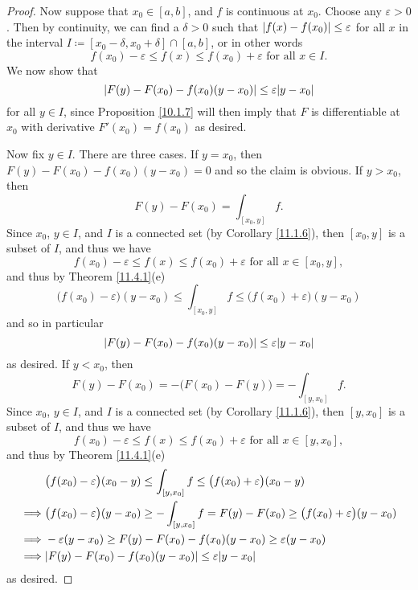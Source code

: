 \begin{proof}
    Now suppose that \(x_0 \in [a, b]\), and \(f\) is continuous at \(x_0\).
    Choose any \(\varepsilon > 0\).
    Then by continuity, we can find a \(\delta > 0\) such that \(\abs*{f(x) - f(x_0)} \leq \varepsilon\) for all \(x\) in the interval \(I \coloneqq [x_0 - \delta, x_0 + \delta] \cap [a, b]\), or in other words
    \[
        f(x_0) - \varepsilon \leq f(x) \leq f(x_0) + \varepsilon \text{ for all } x \in I.
    \]
    We now show that
    \[
        \abs*{F(y) - F(x_0) - f(x_0)(y - x_0)} \leq \varepsilon \abs*{y - x_0}
    \]
    for all \(y \in I\), since Proposition \ref{10.1.7} will then imply that \(F\) is differentiable at \(x_0\) with derivative \(F'(x_0) = f(x_0)\) as desired.

    Now fix \(y \in I\).
    There are three cases.
    If \(y = x_0\), then \(F(y) - F(x_0) - f(x_0)(y - x_0) = 0\) and so the claim is obvious.
    If \(y > x_0\), then
    \[
        F(y) - F(x_0) = \int_{[x_0, y]} f.
    \]
    Since \(x_0\), \(y \in I\), and \(I\) is a connected set (by Corollary \ref{11.1.6}), then \([x_0, y]\) is a subset of \(I\), and thus we have
    \[
        f(x_0) - \varepsilon \leq f(x) \leq f(x_0) + \varepsilon \text{ for all } x \in [x_0, y],
    \]
    and thus by Theorem \ref{11.4.1}(e)
    \[
        \big(f(x_0) - \varepsilon\big) (y - x_0) \leq \int_{[x_0, y]} f \leq \big(f(x_0) + \varepsilon\big) (y - x_0)
    \]
    and so in particular
    \[
        \abs*{F(y) - F(x_0) - f(x_0)(y - x_0)} \leq \varepsilon \abs*{y - x_0}
    \]
    as desired.
    If \(y < x_0\), then
    \[
        F(y) - F(x_0) = -\big(F(x_0) - F(y)\big) = -\int_{[y, x_0]} f.
    \]
    Since \(x_0\), \(y \in I\), and \(I\) is a connected set (by Corollary \ref{11.1.6}), then \([y, x_0]\) is a subset of \(I\), and thus we have
    \[
        f(x_0) - \varepsilon \leq f(x) \leq f(x_0) + \varepsilon \text{ for all } x \in [y, x_0],
    \]
    and thus by Theorem \ref{11.4.1}(e)
    \begin{align*}
                 & \big(f(x_0) - \varepsilon\big) (x_0 - y) \leq \int_{[y, x_0]} f \leq \big(f(x_0) + \varepsilon\big) (x_0 - y)                  \\
        \implies & \big(f(x_0) - \varepsilon\big) (y - x_0) \geq -\int_{[y, x_0]} f = F(y) - F(x_0) \geq \big(f(x_0) + \varepsilon\big) (y - x_0) \\
        \implies & -\varepsilon (y - x_0) \geq F(y) - F(x_0) - f(x_0)(y - x_0) \geq \varepsilon (y - x_0)                                         \\
        \implies & \abs*{F(y) - F(x_0) - f(x_0)(y - x_0)} \leq \varepsilon \abs*{y - x_0}
    \end{align*}
    as desired.
\end{proof}

